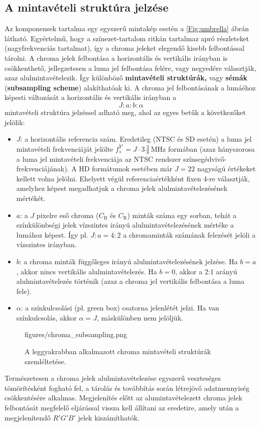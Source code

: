 \subsection{A mintavételi struktúra jelzése}

Az \ycbcr komponensek tartalma egy egyszerű mintakép esetén a \ref{Fig:umbrella} ábrán látható.
Egyértelmű, hogy a színezet-tartalom ritkán tartalmaz apró részleteket (nagyfrekvenciás tartalmat), így a chroma jeleket elegendő kisebb felbontással tárolni.
A chroma jelek felbontása a horizontális és vertikális irányban is csökkenthető, jellegzetesen a luma jel felbontása felére, vagy negyedére választják, azaz alulmintavételezik.
Így különböző \textbf{mintavételi struktúrák,} vagy \textbf{sémák} (\textbf{subsampling scheme}) alakíthatóak ki.
A chroma jel felbontásának a lumáéhoz képesti változását a horizontális és vertikális irányban a
\begin{equation}
J : a : b : \alpha
\end{equation}
mintavételi struktúra jelzéssel adható meg, ahol az egyes betűk a következőket jelölik:
\begin{itemize}
\item $J$: a horizontális referencia szám.
Eredetileg (NTSC és SD esetén) a luma jel mintavételi frekvenciáját jelölte $f^{Y'}_s = J \cdot 3\,\frac{3}{8}~\mathrm{MHz}$ formában (azaz hányszorosa a luma jel mintavételi frekvenciája az NTSC rendszer színsegédvivő-frekvenciájának).
A HD formátumok esetében már $J=22$ nagyságú értékeket kellett volna jelölni.
Ehelyett végül referenciaértékként fixen 4-re választják, amelyhez képest megadhatjuk a chroma jelek alulmintavételezésének mértékét.
\item $a$: a $J$ pixelre eső chroma ($C_{\mathrm{B}}$ és $C_{\mathrm{R}}$) minták száma egy sorban, tehát a színkülönbségi jelek vízszintes irányú alulmintavételezésének mértéke a lumához képest.
Így pl. $J:a= 4:2$ a chromaminták számának felezését jelöli a vízszintes irányban.
\item $b$: a chroma minták függőleges irányú alulmintavételezésének jelzése.
Ha $b = a$, akkor nincs vertikális alulmintavételezés.
Ha $b = 0$, akkor a 2:1 arányú alulmintavételezés történik (azaz a chroma jel vertikális felbontása a luma fele).
\item $\alpha$: a színkulcsolási (pl. green box) csatorna jelenlétét jelzi. 
Ha van színkulcsolás, akkor $\alpha = J$, máskülönben nem jelöljük.
\end{itemize}
\begin{figure}[]
	\centering
	\begin{overpic}[width = 1\columnwidth ]{figures/chroma_subsampling.png}
 	\end{overpic}
	\caption{A leggyakrabban alkalmazott chroma mintavételi struktúrák szemléltetése.}
	\label{Fig:chroma_subsampling}
\end{figure}
Természetesen a chroma jelek alulmintavételezése egyszerű veszteséges tömörítésként fogható fel, a tárolás és továbbítás során létrejövő adatmennyiség csökkentésére alkalmas.
Megjelenítés előtt az alumintavételezett chroma jelek felbontását megfelelő eljárással vissza kell állítani az eredetire, amely után a megjelenítendő $R'G'B'$ jelek kiszámíthatók.

